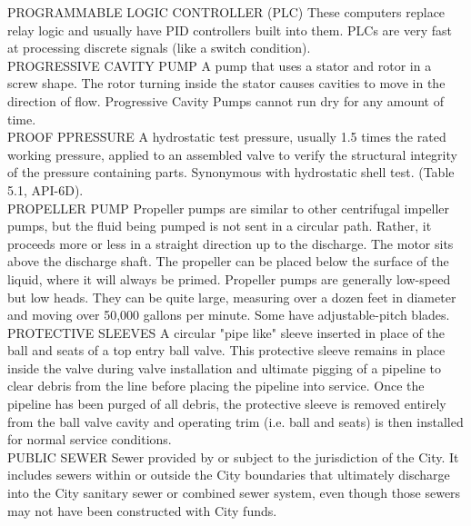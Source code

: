 \documentclass{article}
\begin{document}
PROGRAMMABLE LOGIC CONTROLLER (PLC)
These computers replace relay logic and usually have PID controllers built into them. PLCs are very fast at processing discrete signals (like a switch condition).
\vspace{0.3cm}\\
PROGRESSIVE CAVITY PUMP
A pump that uses a stator and rotor in a screw shape. The rotor turning inside the stator causes cavities to move in the direction of flow. Progressive Cavity Pumps cannot run dry for any amount of time.
\vspace{0.3cm}\\
PROOF PPRESSURE
A hydrostatic test pressure, usually 1.5 times the rated working pressure, applied to an assembled valve to verify the structural integrity of the pressure containing parts. Synonymous with hydrostatic shell test. (Table 5.1, API-6D).
\vspace{0.3cm}\\
PROPELLER PUMP
Propeller pumps are similar to other centrifugal impeller pumps, but the fluid being pumped is not sent in a circular path. Rather, it proceeds more or less in a straight direction up to the discharge. The motor sits above the discharge shaft. The propeller can be placed below the surface of the liquid, where it will always be primed. Propeller pumps are generally low-speed but low heads. They can be quite large, measuring over a dozen feet in diameter and moving over 50,000 gallons per minute. Some have adjustable-pitch blades.
\vspace{0.3cm}\\
PROTECTIVE SLEEVES
A circular "pipe like" sleeve inserted in place of the ball and seats of a top entry ball valve. This protective sleeve remains in place inside the valve during valve installation and ultimate pigging of a pipeline to clear debris from the line before placing the pipeline into service. Once the pipeline has been purged of all debris, the protective sleeve is removed entirely from the ball valve cavity and operating trim (i.e. ball and seats) is then installed for normal service conditions.
\vspace{0.3cm}\\
PUBLIC SEWER
Sewer provided by or subject to the jurisdiction of the City. It includes sewers within or outside the City boundaries that ultimately discharge into the City sanitary sewer or combined sewer system, even though those sewers may not have been constructed with City funds.
\vspace{0.3cm}\\
\end{document}
